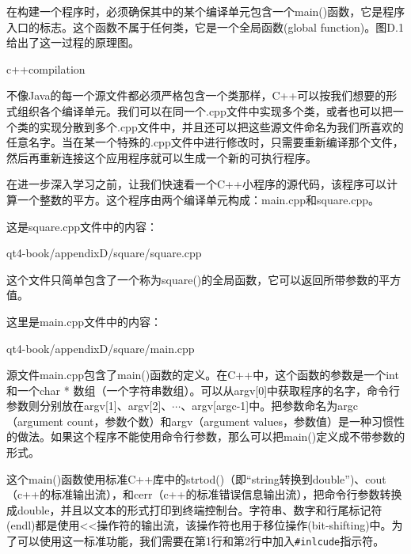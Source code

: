 \documentclass[11pt,oneside]{book}
\begin{document}
\begin{common-format}
在构建一个程序时，必须确保其中的某个编译单元包含一个main()函数，它是程序入口的标志。这个函数不属于任何类，它是一个全局函数(global function)。图D.1给出了这一过程的原理图。
\begin{fig}[0.8]{c++compilation}
\caption{C++的编译过程（在Windows中）}
\label{fig:c++compilation}
\end{fig}

不像Java的每一个源文件都必须严格包含一个类那样，C++可以按我们想要的形式组织各个编译单元。我们可以在同一个.cpp文件中实现多个类，或者也可以把一个类的实现分散到多个.cpp文件中，并且还可以把这些源文件命名为我们所喜欢的任意名字。当在某一个特殊的.cpp文件中进行修改时，只需要重新编译那个文件，然后再重新连接这个应用程序就可以生成一个新的可执行程序。

在进一步深入学习之前，让我们快速看一个C++小程序的源代码，该程序可以计算一个整数的平方。这个程序由两个编译单元构成：main.cpp和square.cpp。

这是square.cpp文件中的内容：
\begin{cppinput}{qt4-book/appendixD/square/square.cpp}
\end{cppinput}

这个文件只简单包含了一个称为square()的全局函数，它可以返回所带参数的平方值。

这里是main.cpp文件中的内容：
\begin{cppinput}{qt4-book/appendixD/square/main.cpp}
\end{cppinput}

源文件main.cpp包含了main()函数的定义。在C++中，这个函数的参数是一个int和一个char * 数组（一个字符串数组）。可以从argv[0]中获取程序的名字，命令行参数则分别放在argv[1]、argv[2]、$\cdots$、argv[argc-1]中。把参数命名为argc（argument count，参数个数）和argv（argument values，参数值）是一种习惯性的做法。如果这个程序不能使用命令行参数，那么可以把main()定义成不带参数的形式。
 
 这个main()函数使用标准C++库中的strtod()（即“string转换到double”)、cout（c++的标准输出流），和cerr（c++的标准错误信息输出流），把命令行参数转换成double，并且以文本的形式打印到终端控制台。字符串、数字和行尾标记符(endl)都是使用<<操作符的输出流，该操作符也用于移位操作(bit-shifting)中。为了可以使用这一标准功能，我们需要在第1行和第2行中加入\verb+#inlcude+指示符。




\end{common-format}
\end{document}
